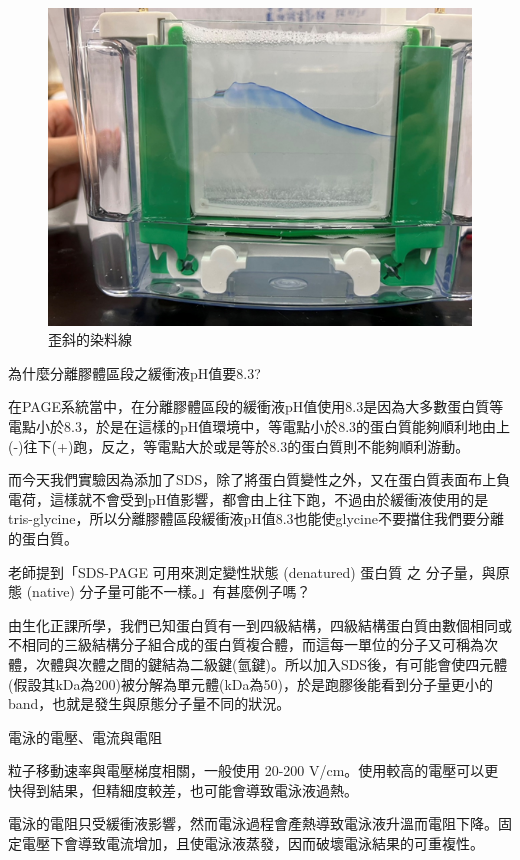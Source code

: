 \begin{figure}[H]
\centering
\includegraphics[width=.6\textwidth]{paste_src/2023-11-13-22-36-02.png}
\caption{歪斜的染料線}
\label{fig:歪斜的染料線}
\end{figure}




\newpage
\dsc 為什麼分離膠體區段之緩衝液pH值要8.3?

在PAGE系統當中，在分離膠體區段的緩衝液pH值使用8.3是因為大多數蛋白質等電點小於8.3，於是在這樣的pH值環境中，等電點小於8.3的蛋白質能夠順利地由上(-)往下(+)跑，反之，等電點大於或是等於8.3的蛋白質則不能夠順利游動。

而今天我們實驗因為添加了SDS，除了將蛋白質變性之外，又在蛋白質表面布上負電荷，這樣就不會受到pH值影響，都會由上往下跑，不過由於緩衝液使用的是tris-glycine，所以分離膠體區段緩衝液pH值8.3也能使glycine不要擋住我們要分離的蛋白質。\cite{3電泳62:online}


\dsc 老師提到「SDS-PAGE 可用來測定變性狀態 (denatured) 蛋白質 之 分子量，與原態 (native) 分子量可能不一樣。」有甚麼例子嗎？

由生化正課所學，我們已知蛋白質有一到四級結構，四級結構蛋白質由數個相同或不相同的三級結構分子組合成的蛋白質複合體，而這每一單位的分子又可稱為次體，次體與次體之間的鍵結為二級鍵(氫鍵)。所以加入SDS後，有可能會使四元體(假設其kDa為200)被分解為單元體(kDa為50)，於是跑膠後能看到分子量更小的band，也就是發生與原態分子量不同的狀況。\cite{蛋白質17:online}


\dsc 電泳的電壓、電流與電阻

粒子移動速率與電壓梯度相關，一般使用 20-200 V/cm。使用較高的電壓可以更快得到結果，但精細度較差，也可能會導致電泳液過熱。

電泳的電阻只受緩衝液影響，然而電泳過程會產熱導致電泳液升溫而電阻下降。固定電壓下會導致電流增加，且使電泳液蒸發，因而破壞電泳結果的可重複性。\cite{v:online}



 

